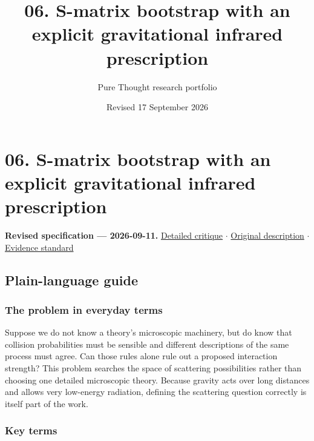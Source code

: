 \documentclass[
  11pt,
]{article}
\title{06. S-matrix bootstrap with an explicit gravitational infrared
prescription}
\author{Pure Thought research portfolio}
\date{Revised 17 September 2026}
\begin{document}
\maketitle
\thispagestyle{empty}
\clearpage

\section{06. S-matrix bootstrap with an explicit gravitational infrared
prescription}

\textbf{Revised specification --- 2026-09-11.}
\href{https://github.com/rick-stevens-ai/Pure-Thought/blob/main/reviews/06-Nonperturbative-S-matrix-Bootstrap.md}{Detailed
critique} \ensuremath{\cdot}
\href{https://github.com/rick-stevens-ai/Pure-Thought/blob/main/archive/original-PRDs/06-Nonperturbative-S-matrix-Bootstrap.md}{Original
description} \ensuremath{\cdot}
\href{https://github.com/rick-stevens-ai/Pure-Thought/blob/main/reviews/EVIDENCE-STANDARD.md}{Evidence
standard}

\subsection{Plain-language guide}

\subsubsection{The problem in everyday terms}

Suppose we do not know a theory's microscopic machinery, but do know
that collision probabilities must be sensible and different descriptions
of the same process must agree. Can those rules alone rule out a
proposed interaction strength? This problem searches the space of
scattering possibilities rather than choosing one detailed microscopic
theory. Because gravity acts over long distances and allows very
low-energy radiation, defining the scattering question correctly is
itself part of the work.

\subsubsection{Key terms}
\end{document}
